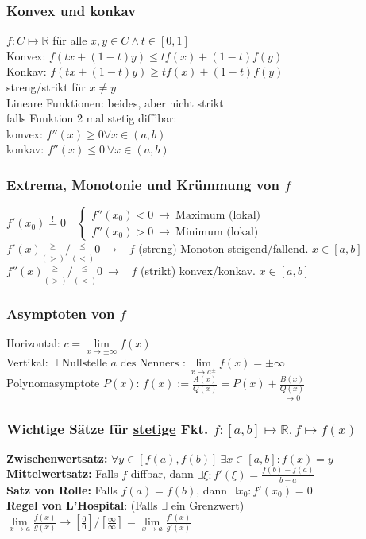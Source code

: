 \documentclass[6pt,a4paper]{scrartcl}
\newcommand{\ra}[0]{\ensuremath{\rightarrow}}
\newcommand{\R}{\ensuremath{\mathbb R}}
\begin{document}
\begin{multicols}{4}
\subsubsection{Konvex und konkav}
$f: C\mapsto\R$ für alle $x,y \in C \wedge t \in [0,1]$\\
Konvex: $f(tx+(1-t)y)\leq tf(x)+(1-t)f(y)$ \\
Konkav: $f(tx+(1-t)y)\geq tf(x)+(1-t)f(y)$ \\
streng/strikt für $x \neq y$ \\
Lineare Funktionen: beides, aber nicht strikt \\
falls Funktion 2 mal stetig diff'bar: \\
konvex: $f''(x)\geq 0 \forall x \in (a,b)$ \\
konkav: $f''(x)\leq 0 ~\forall x \in (a,b)$

\subsubsection{Extrema, Monotonie und Krümmung von $f$}
$f'(x_0)\overset{!}{=}0 \quad \begin{cases}f''(x_0)<0 \ \rightarrow \ \text{Maximum (lokal)} \\ f''(x_0)>0 \ \rightarrow \ \text{Minimum (lokal)}\end{cases} $\\
$f'(x) \underset{(>)}{^{\ge}} / \underset{(<)}{^{\le}} 0 \ \rightarrow$ \ $f$ (streng) Monoton steigend/fallend. $x\in[a,b]$\\
$f''(x) \underset{(>)}{^{\ge}} / \underset{(<)}{^{\le}} 0 \ \rightarrow$ \ $f$ (strikt) konvex/konkav. $x\in[a,b]$\\

\subsubsection{Asymptoten von $f$}
Horizontal: $c=\lim\limits_{x\ra \pm \infty} f(x)$\\
Vertikal: $\exists \text{ Nullstelle } a \text{ des Nenners }: \lim\limits_{x \rightarrow a^{\pm}} f(x) = \pm \infty$\\
Polynomasymptote $P(x)$: $f(x):=\frac{A(x)}{Q(x)}=P(x)+ \underset{\ra 0}{\frac{B(x)}{Q(x)}}$


\subsubsection{Wichtige Sätze für \underline{stetige} Fkt. $f: [a,b] \mapsto \R, f \mapsto f(x)$ }
\textbf{Zwischenwertsatz:} $\forall y \in [f(a),f(b)]\ \exists x\in [a,b]:f(x)=y$\\
\textbf{Mittelwertsatz:} Falls $f$ diffbar, dann $\exists \xi:f'(\xi)=\frac{f(b)-f(a)}{b-a}$\\
\textbf{Satz von Rolle:} Falls $f(a)=f(b)$, dann $\exists x_0: f' (x_0) = 0$\\
\textbf{Regel von L'Hospital}: (Falls $\exists$ ein Grenzwert) \\ $\lim\limits_{x \rightarrow a} \frac{f(x)}{g(x)} \rightarrow \left[ \frac{0}{0} \right] / \left[ \frac{\infty}{\infty} \right] = \lim\limits_{x \rightarrow a} \frac{f'(x)}{g'(x)}$


\end{multicols}
\end{document}
